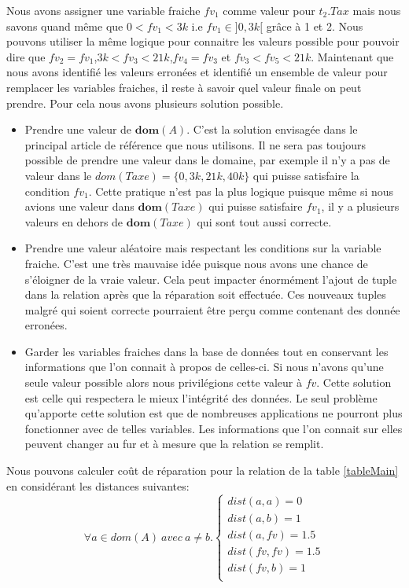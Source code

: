\documentclass[letterpaper, 12pt]{report}
\theoremstyle{definition}
\newcommand{\dom}{\mathbf{dom}}
\begin{document}
Nous avons assigner une variable fraiche $fv_1$ comme valeur pour $t_2.Tax$ mais nous savons quand même que $0<fv_1<3k$ i.e $fv_1 \in ]0,3k[$ grâce à 1 et 2. Nous pouvons utiliser la même logique pour connaitre les valeurs possible pour pouvoir dire que $fv_2 = fv_1$,$3k<fv_3<21k$,$fv_4 = fv_3$ et $fv_3<fv_5<21k$. Maintenant que nous avons identifié les valeurs erronées et identifié un ensemble de valeur pour remplacer les variables fraiches, il reste à savoir quel valeur finale on peut prendre. Pour cela nous avons plusieurs solution possible.\\
\begin{itemize}
	\item Prendre une valeur de $\dom(A)$. C'est la solution envisagée dans le principal article de référence que nous utilisons. Il ne sera pas toujours possible de prendre une valeur dans le domaine, par exemple il n'y a pas de valeur dans le $dom(Taxe)= \{0,3k,21k,40k\}$ qui puisse satisfaire la condition $fv_1$. Cette pratique n'est pas la plus logique puisque même si nous avions une valeur dans $\dom(Taxe)$ qui puisse satisfaire $fv_1$, il y a plusieurs valeurs en dehors de $\dom(Taxe)$ qui sont tout aussi correcte.
	\item Prendre une valeur aléatoire mais respectant les conditions sur la variable fraiche. C'est une très mauvaise idée puisque nous avons une chance de s'éloigner de la vraie valeur. Cela peut impacter énormément l'ajout de tuple dans la relation après que la réparation soit effectuée. Ces nouveaux tuples malgré qui soient correcte pourraient être perçu comme contenant des donnée erronées.
	\item Garder les variables fraiches dans la base de données tout en conservant les informations que l'on connait à propos de celles-ci. Si nous n'avons qu'une seule valeur possible alors nous privilégions cette valeur à $fv$. Cette solution est celle qui respectera le mieux l'intégrité des données. Le seul problème qu'apporte cette solution est que de nombreuses applications ne pourront plus fonctionner avec de telles variables. Les informations que l'on connait sur elles peuvent changer au fur et à mesure que la relation se remplit.
\end{itemize}

Nous pouvons calculer coût de réparation pour la relation de la table \ref{tableMain} en considérant les distances suivantes:\\

$$
\forall a \in dom(A) \ avec \ a \neq b.
\left\{
	\begin{array}{ll}
	   dist(a,a)=0\\
	   dist(a,b)=1\\
	   dist(a,fv)=1.5\\
	   dist(fv,fv)=1.5\\
	   dist(fv,b)=1\\
	\end{array}
\right.
$$
\end{document}
